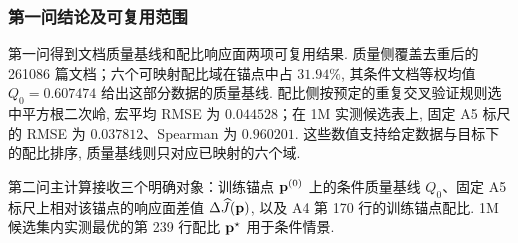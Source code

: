 
\subsubsection{第一问结论及可复用范围}
第一问得到文档质量基线和配比响应面两项可复用结果. 质量侧覆盖去重后的 261086 篇文档；六个可映射配比域在锚点中占 $31.94\%$, 其条件文档等权均值 $Q_0=0.607474$ 给出这部分数据的质量基线. 配比侧按预定的重复交叉验证规则选中平方根二次岭, 宏平均 RMSE 为 $0.044528$；在 1M 实测候选表上, 固定 A5 标尺的 RMSE 为 $0.037812$、Spearman 为 $0.960201$. 这些数值支持给定数据与目标下的配比排序, 质量基线则只对应已映射的六个域. 

第二问主计算接收三个明确对象：训练锚点 $\mathbf p^{(0)}$ 上的条件质量基线 $Q_0$、固定 A5 标尺上相对该锚点的响应面差值 $\Delta\widehat J(\mathbf p)$, 以及 A4 第 170 行的训练锚点配比. 1M 候选集内实测最优的第 239 行配比 $\mathbf p^\star$ 用于条件情景. 

